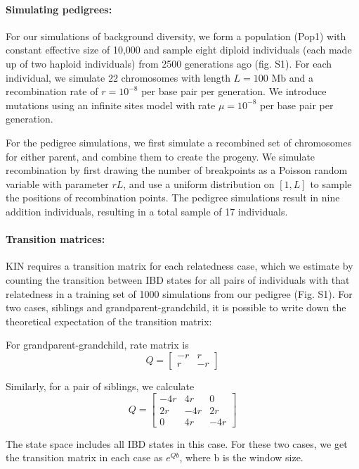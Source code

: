 \documentclass[12pt, letterpaper]{article}
\begin{document}
\paragraph{Simulating pedigrees:}

For our simulations of background diversity, we form a population (Pop1) with constant effective size of 10,000 and sample eight diploid individuals (each made up of two haploid individuals) from 2500 generations ago (fig. S1). For each individual, we simulate 22 chromosomes with length $L=100$ Mb and a recombination rate of $r=10^{-8}$ per base pair per generation. We introduce mutations using an infinite sites model with rate  $\mu= 10^{-8}$ per base pair per generation. 

For the pedigree simulations, we first simulate a recombined set of chromosomes for either parent, and combine them to create the progeny. We simulate recombination by first drawing the number of breakpoints as a  Poisson random variable with parameter $rL$, and use a uniform distribution on $[1, L]$ to sample the positions of recombination points. The pedigree simulations result in nine addition individuals, resulting in a total sample of 17 individuals.

\paragraph{Transition matrices:}
KIN requires a transition matrix for each relatedness case, which we estimate by counting the transition between IBD states for all pairs of individuals with that relatedness in a training set of 1000 simulations from our pedigree (Fig. S1). For two cases, siblings and grandparent-grandchild, it is possible to write down the theoretical expectation of the transition matrix: 

For grandparent-grandchild, rate matrix is
 $$Q = \left[\begin{array}
{rrr}
-r & r \\
r & -r 
\end{array}\right]$$   

Similarly, for a pair of siblings, we calculate $$Q =  
\left[\begin{array}
{rrr}
-4r & 4r & 0\\
2r & -4r & 2r\\
0 & 4r & -4r
\end{array}\right]$$   

The state space includes all IBD states in this case. For these two cases, we get the transition matrix in each case as $e^{Qb}$, where b is the window size.
\end{document}
